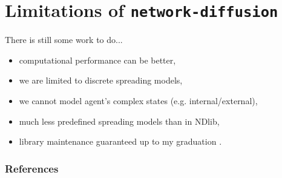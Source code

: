 \documentclass{beamer}
\begin{document}
\section{Limitations of \lstinline[style=py]{network-diffusion}}

\begin{frame}{\secname}
    There is still some work to do...
    \vspace{1em}
    \begin{itemize}
        \item computational performance can be better,
        \item we are limited to discrete spreading models,
        \item we cannot model agent's complex states (e.g. internal/external),
        \item much less predefined spreading models than in NDlib,
        \item library maintenance guaranteed up to my graduation \Winkey.
    \end{itemize}
\end{frame}

\begin{frame}[allowframebreaks]
    \frametitle{References}
    \printbibliography
\end{frame}

\addtocounter{framenumber}{1}
\end{document}
